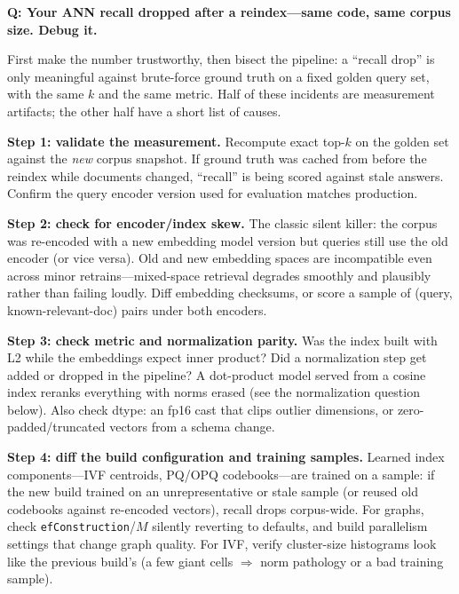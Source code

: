 \begin{interviewq}
\textbf{Q: Your ANN recall dropped after a reindex---same code, same corpus size. Debug it.}

 \quad {} \quad \badgefreq{\freqmed}

\stronganswer

First make the number trustworthy, then bisect the pipeline: a ``recall drop'' is only meaningful against brute-force ground truth on a fixed golden query set, with the same $k$ and the same metric. Half of these incidents are measurement artifacts; the other half have a short list of causes.

\textbf{Step 1: validate the measurement.} Recompute exact top-$k$ on the golden set against the \emph{new} corpus snapshot. If ground truth was cached from before the reindex while documents changed, ``recall'' is being scored against stale answers. Confirm the query encoder version used for evaluation matches production.

\textbf{Step 2: check for encoder/index skew.} The classic silent killer: the corpus was re-encoded with a new embedding model version but queries still use the old encoder (or vice versa). Old and new embedding spaces are incompatible even across minor retrains---mixed-space retrieval degrades smoothly and plausibly rather than failing loudly. Diff embedding checksums, or score a sample of (query, known-relevant-doc) pairs under both encoders.

\textbf{Step 3: check metric and normalization parity.} Was the index built with L2 while the embeddings expect inner product? Did a normalization step get added or dropped in the pipeline? A dot-product model served from a cosine index reranks everything with norms erased (see the normalization question below). Also check dtype: an fp16 cast that clips outlier dimensions, or zero-padded/truncated vectors from a schema change.

\textbf{Step 4: diff the build configuration and training samples.} Learned index components---IVF centroids, PQ/OPQ codebooks---are trained on a sample: if the new build trained on an unrepresentative or stale sample (or reused old codebooks against re-encoded vectors), recall drops corpus-wide. For graphs, check \texttt{efConstruction}/$M$ silently reverting to defaults, and build parallelism settings that change graph quality. For IVF, verify cluster-size histograms look like the previous build's (a few giant cells $\Rightarrow$ norm pathology or a bad training sample).


\end{interviewq}
